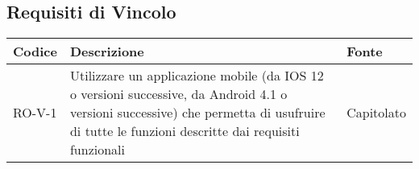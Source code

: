 \subsection{Requisiti di Vincolo}
\begin{center}
\renewcommand{\arraystretch}{1.8} %
\begin{tabular}{ | m{8em} | m{18em} | m{12em} | }
\hline
Codice&Descrizione&Fonte\\
\hline
RO-V-1& Utilizzare un applicazione mobile (da IOS 12 o versioni successive, da Android 4.1 o versioni successive) che permetta di usufruire di tutte le funzioni descritte dai requisiti funzionali&Capitolato\\
\hline
\end{tabular}
\end{center}